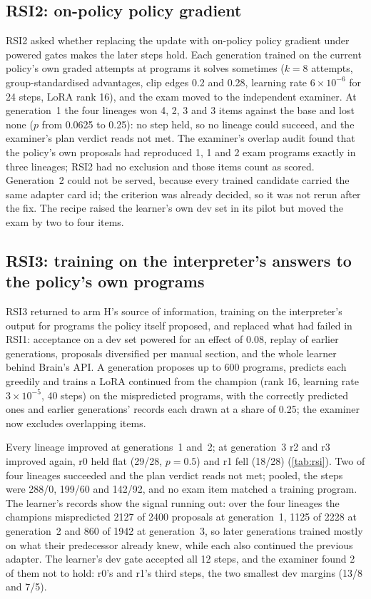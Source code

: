 \subsection{RSI2: on-policy policy gradient}\label{sec:rsi2}

RSI2 asked whether replacing the update with on-policy policy gradient under powered gates makes the
later steps hold. Each generation trained on the current policy's own graded attempts at programs it
solves sometimes ($k=8$ attempts, group-standardised advantages, clip edges 0.2 and 0.28, learning
rate $6\times10^{-6}$ for 24 steps, LoRA rank 16), and the exam moved to the independent
examiner. At generation~1 the four lineages won 4, 2, 3 and 3 items against the base and
lost none ($p$ from 0.0625 to 0.25): no step held, so no lineage could succeed, and the examiner's
plan verdict reads not met. The examiner's overlap audit found that the policy's own
proposals had reproduced 1, 1 and 2 exam programs exactly in three lineages; RSI2 had no exclusion
and those items count as scored. Generation~2 could not be served, because every trained
candidate carried the same adapter card id; the criterion was already decided, so it was not rerun
after the fix. The recipe raised the learner's own dev set in its pilot but moved the exam by
two to four items.

\subsection{RSI3: training on the interpreter's answers to the policy's own programs}\label{sec:rsi3}

RSI3 returned to arm H's source of information, training on the interpreter's output for programs the
policy itself proposed, and replaced what had failed in RSI1: acceptance on a dev set powered for an
effect of 0.08, replay of earlier generations, proposals diversified per manual section, and the whole
learner behind Brain's API. A generation proposes up to 600 programs, predicts each greedily and
trains a LoRA continued from the champion (rank 16, learning rate $3\times10^{-5}$, 40 steps) on the
mispredicted programs, with the correctly predicted ones and earlier generations' records each drawn
at a share of 0.25; the examiner now excludes overlapping items.

Every lineage improved at generations~1 and~2; at generation~3 r2 and r3 improved again, r0 held
flat (29/28, $p=0.5$) and r1 fell (18/28) (\cref{tab:rsi}). Two of four lineages succeeded and the
plan verdict reads not met; pooled, the steps were 288/0, 199/60 and 142/92, and no exam item matched a
training program. The learner's records show the signal running out: over the four
lineages the champions mispredicted 2127 of 2400 proposals at generation~1, 1125 of 2228 at
generation~2 and 860 of 1942 at generation~3, so later generations trained mostly on what their
predecessor already knew, while each also continued the previous adapter. The learner's dev
gate accepted all 12 steps, and the examiner found 2 of them not to hold: r0's and r1's third steps,
the two smallest dev margins (13/8 and 7/5).

